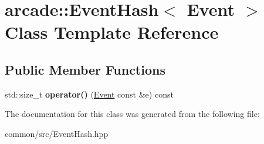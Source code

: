 \hypertarget{classarcade_1_1EventHash_3_01Event_01_4}{}\section{arcade\+:\+:Event\+Hash$<$ Event $>$ Class Template Reference}
\label{classarcade_1_1EventHash_3_01Event_01_4}
\subsection*{Public Member Functions}
\begin{DoxyCompactItemize}
\item 
\mbox{\label{classarcade_1_1EventHash_3_01Event_01_4_a40427b86b1b717cf9fb3feb9ad58d064}} 
std\+::size\+\_\+t {\bfseries operator()} (\hyperlink{structarcade_1_1Event}{Event} const \&e) const
\end{DoxyCompactItemize}


The documentation for this class was generated from the following file\+:\begin{DoxyCompactItemize}
\item 
common/src/Event\+Hash.\+hpp\end{DoxyCompactItemize}
